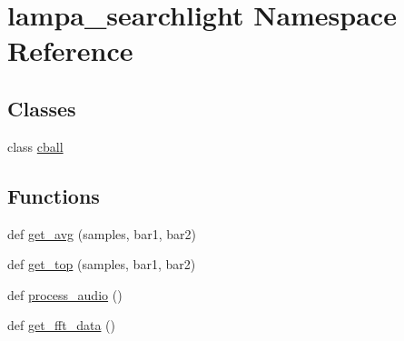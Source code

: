 \hypertarget{namespacelampa__searchlight}{}\section{lampa\+\_\+searchlight Namespace Reference}
\label{namespacelampa__searchlight}
\subsection*{Classes}
\begin{DoxyCompactItemize}
\item 
class \hyperlink{classlampa__searchlight_1_1cball}{cball}
\end{DoxyCompactItemize}
\subsection*{Functions}
\begin{DoxyCompactItemize}
\item 
def \hyperlink{namespacelampa__searchlight_ad3d1ac52979fc22e38e87631cae2595f}{get\+\_\+avg} (samples, bar1, bar2)
\item 
def \hyperlink{namespacelampa__searchlight_aedf54322c274916b00b3c70c34a5127e}{get\+\_\+top} (samples, bar1, bar2)
\item 
def \hyperlink{namespacelampa__searchlight_ab5356624d2d86561e69c80231e0be402}{process\+\_\+audio} ()
\item 
def \hyperlink{namespacelampa__searchlight_a28ff2343690d6bbf0fba90a140841c57}{get\+\_\+fft\+\_\+data} ()
\end{DoxyCompactItemize}

